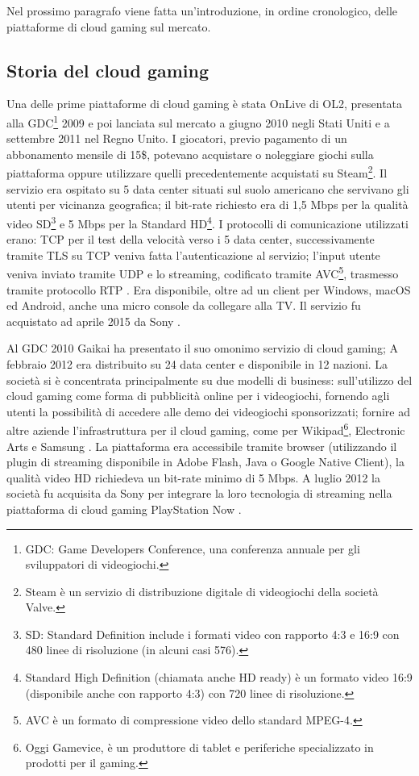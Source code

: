 Nel prossimo paragrafo viene fatta un'introduzione, in ordine cronologico, delle piattaforme di cloud gaming sul mercato.

\subsection{Storia del cloud gaming} \label{StoriaDelCloudGaming}
Una delle prime piattaforme di cloud gaming è stata OnLive di OL2, presentata alla GDC\footnote{GDC: Game Developers Conference, una conferenza annuale per gli sviluppatori di videogiochi.} 2009 e poi lanciata sul mercato a giugno 2010 negli Stati Uniti e a settembre 2011 nel Regno Unito. I giocatori, previo pagamento di un abbonamento mensile di 15\$, potevano acquistare o noleggiare giochi sulla piattaforma oppure utilizzare quelli precedentemente acquistati su Steam\footnote{Steam è un servizio di distribuzione digitale di videogiochi della società Valve.}. Il servizio era ospitato su 5 data center situati sul suolo americano che servivano gli utenti per vicinanza geografica; il bit-rate richiesto era di 1,5 Mbps per la qualità video SD\footnote{SD: Standard Definition include i formati video con rapporto 4:3 e 16:9 con 480 linee di risoluzione (in alcuni casi 576).} e 5 Mbps per la Standard HD\footnote{Standard High Definition (chiamata anche HD ready) è un formato video 16:9 (disponibile anche con rapporto 4:3) con 720 linee di risoluzione.}. I protocolli di comunicazione utilizzati erano: TCP per il test della velocità verso i 5 data center, successivamente tramite TLS su TCP veniva fatta l'autenticazione al servizio; l'input utente veniva inviato tramite UDP e lo streaming, codificato tramite AVC\footnote{AVC è un formato di compressione video dello standard MPEG-4.}, trasmesso tramite protocollo RTP \parencite{Dissecting_the_protocol_and_network_traffic_of_the_OnLive_cloud_gaming_platform}. Era disponibile, oltre ad un client per Windows, macOS ed Android, anche una micro console da collegare alla TV. Il servizio fu acquistato ad aprile 2015 da Sony \parencite{Cloud_gaming_history}.

Al GDC 2010 Gaikai ha presentato il suo omonimo servizio di cloud gaming; A febbraio 2012 era distribuito su 24 data center e disponibile in 12 nazioni. La società si è concentrata principalmente su due modelli di business: sull'utilizzo del cloud gaming come forma di pubblicità online per i videogiochi, fornendo agli utenti la possibilità di accedere alle demo dei videogiochi sponsorizzati; fornire ad altre aziende l'infrastruttura per il cloud gaming, come per Wikipad\footnote{Oggi Gamevice, è un produttore di tablet e periferiche specializzato in prodotti per il gaming.}, Electronic Arts e Samsung \parencite{Gaikai_open_platform}. La piattaforma era accessibile tramite browser (utilizzando il plugin di streaming disponibile in Adobe Flash, Java o Google Native Client), la qualità video HD richiedeva un bit-rate minimo di 5 Mbps. A luglio 2012 la società fu acquisita da Sony per integrare la loro tecnologia di streaming nella piattaforma di cloud gaming PlayStation Now \parencite{Gaikai_Beta}.

